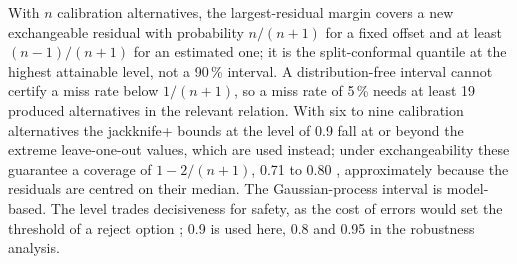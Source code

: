 \documentclass[pdflatex,sn-basic,lineno]{sn-jnl}
\begin{document}
With $n$ calibration alternatives, the largest-residual margin covers a new exchangeable residual with probability $n/(n+1)$ for a fixed offset and at least $(n-1)/(n+1)$ for an estimated one; it is the split-conformal quantile \citep{lei2018distribution} at the highest attainable level, not a 90\,\% interval. A distribution-free interval cannot certify a miss rate below $1/(n+1)$, so a miss rate of 5\,\% needs at least 19 produced alternatives in the relevant relation. With six to nine calibration alternatives the jackknife+ bounds at the level of 0.9 fall at or beyond the extreme leave-one-out values, which are used instead; under exchangeability these guarantee a coverage of $1-2/(n+1)$, 0.71 to 0.80 \citep{barber2021predictive}, approximately because the residuals are centred on their median. The Gaussian-process interval is model-based. The level trades decisiveness for safety, as the cost of errors would set the threshold of a reject option \citep{chow1970optimum}; 0.9 is used here, 0.8 and 0.95 in the robustness analysis.
\end{document}
